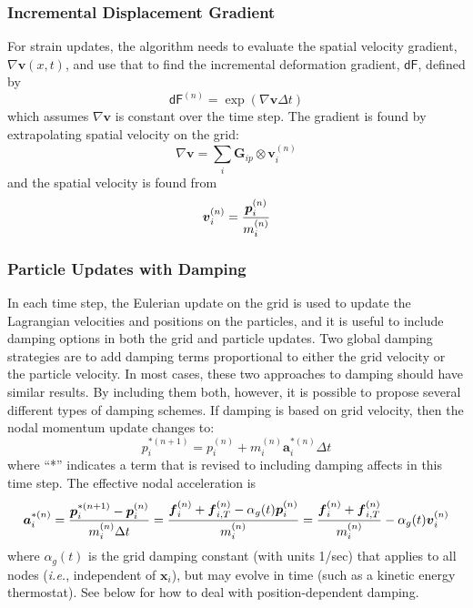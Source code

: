 \documentclass[11pt]{article}
\renewcommand{\vec}[1]{\boldsymbol{#1}}
\newcommand{\tens}[1]{\boldsymbol{\mathsf{#1}}}
\begin{document}
\subsubsection{Incremental Displacement Gradient}

For strain updates, the algorithm needs to evaluate the spatial velocity gradient, $\nabla \vec v(x,t)$, and use that to find the incremental deformation gradient, $\tens{dF}$, defined by
\begin{equation}
     \tens{dF}^{(n)} = \exp(\nabla \vec v \Delta t)
\end{equation}
which assumes $\nabla \vec v$ is constant over the time step. The gradient is found by extrapolating spatial velocity on the grid:
\begin{equation}
    \nabla \vec v = \sum_i \vec G_{ip} \otimes \vec v_i^{(n)}
\end{equation}
and the spatial velocity is found from
\begin{equation}
      \vec  v_i^{(n)} = {\vec p_i^{(n)}\over m_i^{(n)}} 
\end{equation}

\subsubsection{Particle Updates with Damping}

In each time step, the Eulerian update on the grid is used to update the Lagrangian velocities and positions on the particles, and it is useful to include damping options in both the grid and particle updates. Two global damping strategies are to add damping terms proportional to either the grid velocity or the particle velocity. In most cases, these two approaches to damping should have similar results. By including them both, however, it is possible to propose several different types of damping schemes. If damping is based on grid velocity, then the nodal momentum update changes to:
\begin{equation}
     p_i^{*(n+1)} = p_i^{(n)} +  m_i^{(n)}\vec a_i^{*(n)}\Delta t
\end{equation}
where ``*'' indicates a term that is revised to including damping affects in this time step. The effective nodal acceleration is
\begin{equation}
    \vec a_i^{*(n)} = {\vec p_i^{*(n+1)}-\vec p_i^{(n)} \over m_i^{(n)}\Delta t}
         =  { \vec f_{i}^{(n)} + \vec f_{i,T}^{(n)} - \alpha_g(t)\vec p_i^{(n)}  \over m_i^{(n)}}
          =  { \vec f_{i}^{(n)} + \vec f_{i,T}^{(n)} \over m_i^{(n)}} -  \alpha_g(t)\vec v_i^{(n)}
\end{equation}
where $\alpha_g(t)$ is the grid damping constant (with units 1/sec) that applies to all nodes (\emph{i.e.}, independent of $\vec x_i$), but may evolve in time (such as a kinetic energy thermostat). See below for how to deal with position-dependent damping.
\end{document}
